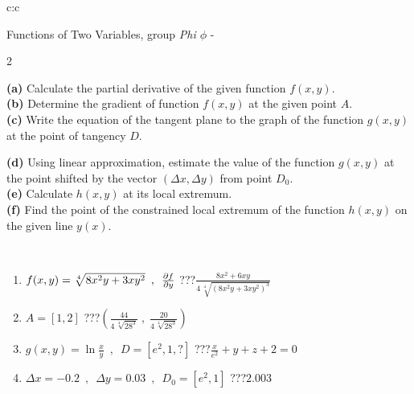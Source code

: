 \documentclass[10pt]{report}
\begin{document}
\begin{tabular}{c:c}
\begin{minipage}[c][104.5mm][t]{0.5\linewidth}
\begin{center}
\vspace{7mm}
{\huge \LARGE Functions of Two Variables, group \textit{Phi $\phi$} -}\\[5mm]
\begin{minipage}{0.95\linewidth}
\begin{center}
{\small \begin{multicols}{2} \raggedright
\textbf{(a)} Calculate the partial derivative of the given function \(f(x,y)\). \\[1mm]
\textbf{(b)} Determine the gradient of function \(f(x,y)\) at the given point \(A\). \\[1mm]
\textbf{(c)} Write the equation of the tangent plane to the graph of the function \(g(x,y)\) at the point of tangency \(D\). \par \columnbreak
\textbf{(d)} Using linear approximation, estimate the value of the function \(g(x,y)\) at the point shifted by the vector \((\Delta x, \Delta y)\) from point \(D_0\). \\[1mm]
\textbf{(e)} Calculate \(h(x,y)\) at its local extremum. \\[1mm]
\textbf{(f)} Find the point of the constrained local extremum of the function \(h(x,y)\) on the given line \(y(x)\). \\[1mm]
\end{multicols}
}
\end{center}
\end{minipage}
\\[4mm]
\begin{minipage}{0.79\linewidth}
\begin{center}
\begin{varwidth}{\linewidth}
\begin{enumerate}
\normalsizerr
\item $f(x,y) = \sqrt[4]{8x^2y + 3xy^2}\enspace , \enspace \pdv{f}{y}$\quad \dotfill\; ???\;\dotfill \quad $\frac{8x^2+6xy}{4\,\sqrt[4]{(8x^2y+3xy^2)^{3}}}$
\item $A = [1, 2]$\quad \dotfill\; ???\;\dotfill \quad $\left( \frac{44}{4\,\sqrt[4]{28^3}} \;,\; \frac{20}{4\,\sqrt[4]{28^3}} \right)$
\item $g(x,y) = \ln\frac{x}{y} \enspace , \enspace D=[e^{2},1,?]$\quad \dotfill\; ???\;\dotfill \quad $\frac{x}{e^2} + y + z + 2 = 0$
\item $\Delta x = {-0.2} \enspace,\enspace \Delta y = {0.03} \enspace,\enspace D_0 = [e^{2},1]$\quad \dotfill\; ???\;\dotfill \quad $2.003$

\end{enumerate}
\end{varwidth}
\end{center}
\end{minipage}
\end{center}
\end{minipage}
\end{tabular}
\end{document}
